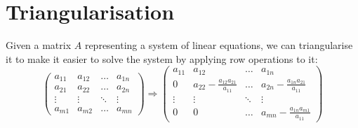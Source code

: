 \documentclass{article}
\begin{document}
\section{Triangularisation}
Given a matrix $A$ representing a system of linear equations, we can triangularise it to make it easier to solve the system by applying row operations to it:
\begin{equation*}
	\left(
		\begin{matrix}
			a_{11} & a_{12} & \dots & a_{1n} \\
			a_{21} & a_{22} & \dots & a_{2n} \\
			\vdots & \vdots & \ddots & \vdots \\
			a_{m1} & a_{m2} & \dots & a_{mn}
		\end{matrix}
	\right) \Longrightarrow \left(
		\begin{matrix}
			a_{11} & a_{12} & \dots & a_{1n} \\
			0 & a_{22} - \frac{a_{12}a_{21}}{a_{11}} & \dots & a_{2n} - \frac{a_{1n}a_{21}}{a_{11}} \\
			\vdots & \vdots & \ddots & \vdots \\
			0 & 0 & \dots & a_{mn} - \frac{a_{1n}a_{m1}}{a_{11}}
		\end{matrix}
	\right)
\end{equation*}
\end{document}
